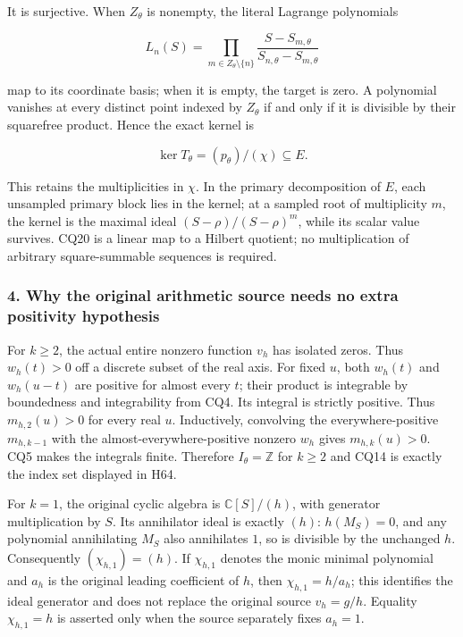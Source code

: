 It is surjective. When \(Z_\theta\) is nonempty, the literal Lagrange polynomials

\[
L_n(S)=\prod_{m\in Z_\theta\setminus\{n\}}
\frac{S-S_{m,\theta}}{S_{n,\theta}-S_{m,\theta}}
\tag{CQ21}
\]

map to its coordinate basis; when it is empty, the target is zero. A polynomial vanishes at every distinct point indexed by \(Z_\theta\) if and only if it is divisible by their squarefree product. Hence the exact kernel is

\[
\ker T_\theta=(p_\theta)/(\chi)\subseteq E.
\tag{CQ22}
\]

This retains the multiplicities in \(\chi\). In the primary decomposition of \(E\), each unsampled primary block lies in the kernel; at a sampled root of multiplicity \(m\), the kernel is the maximal ideal \((S-\rho)/(S-\rho)^m\), while its scalar value survives. CQ20 is a linear map to a Hilbert quotient; no multiplication of arbitrary square-summable sequences is required.

\subsubsection{4. Why the original arithmetic source needs no extra positivity hypothesis}\label{why-the-original-arithmetic-source-needs-no-extra-positivity-hypothesis}

For \(k \ge 2\), the actual entire nonzero function \(v_h\) has isolated zeros. Thus \(w_h(t)>0\) off a discrete subset of the real axis. For fixed \(u\), both \(w_h(t)\) and \(w_h(u-t)\) are positive for almost every \(t\); their product is integrable by boundedness and integrability from CQ4. Its integral is strictly positive. Thus \(m_{h,2}(u)>0\) for every real \(u\). Inductively, convolving the everywhere-positive \(m_{h,k-1}\) with the almost-everywhere-positive nonzero \(w_h\) gives \(m_{h,k}(u)>0\). CQ5 makes the integrals finite. Therefore \(I_\theta=\mathbb Z\) for \(k \ge 2\) and CQ14 is exactly the index set displayed in H64.

For \(k=1\), the original cyclic algebra is \(\mathbb C[S]/(h)\), with generator multiplication by \(S\). Its annihilator ideal is exactly \((h)\): \(h(M_S)=0\), and any polynomial annihilating \(M_S\) also annihilates \(1\), so is divisible by the unchanged \(h\). Consequently \((\chi_{h,1})=(h)\). If \(\chi_{h,1}\) denotes the monic minimal polynomial and \(a_h\) is the original leading coefficient of \(h\), then \(\chi_{h,1}=h/a_h\); this identifies the ideal generator and does not replace the original source \(v_h=g/h\). Equality \(\chi_{h,1}=h\) is asserted only when the source separately fixes \(a_h=1\).

